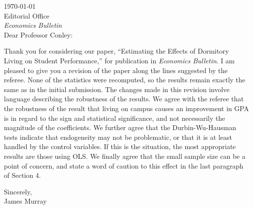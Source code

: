 \documentclass[12pt]{letter}
\begin{document}
\vspace*{-0.5in}

\today\\

Editorial Office\\
\textit{Economics Bulletin}\\ 

Dear Professor Conley:

Thank you for considering our paper, ``Estimating the Effects of Dormitory Living on Student Performance,'' for publication in \textit{Economics Bulletin}.  I am pleased to give you a revision of the paper along the lines suggested by the referee.  None of the statistics were recomputed, so the results remain exactly the same as in the initial submission.  The changes made in this revision involve language describing the robustness of the results.  We agree with the referee that the robustness of the result that living on campus causes an improvement in GPA is in regard to the sign and statistical significance, and not necessarily the magnitude of the coefficients.  We further agree that the Durbin-Wu-Hausman tests indicate that endogeneity may not be problematic, or that it is at least handled by the control variables.  If this is the situation, the most appropriate results are those using OLS.  We finally agree that the small sample size can be a point of concern, and state a word of caution to this effect in the last paragraph of Section 4.

Sincerely,\\
James Murray
\end{document}

